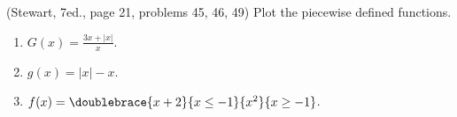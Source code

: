 (Stewart, 7ed., page 21, problems 45, 46, 49)
Plot the piecewise defined functions.
\begin{multicols}{2}
\begin{enumerate}
\item $G(x)=\frac{3x+|x|}x$.
\item $g(x)=|x|-x$.
\item $f(x)=\doublebrace{x+2}{x\leq -1}{x^2}{x\geq -1}$.
\end{enumerate}
\end{multicols}
